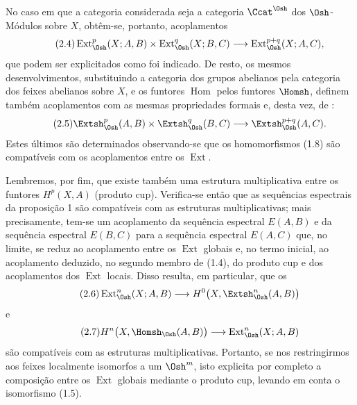 No caso em que a categoria considerada seja a categoria $\Ccat^{\Osh}$ dos
$\Osh$-Módulos sobre $X$, obtêm-se, portanto, acoplamentos
\begin{equation}\tag{2.4}
  \operatorname{Ext}_{\Osh}^{p}(X;A,B)
  \times\operatorname{Ext}_{\Osh}^{q}(X;B,C)
  \longrightarrow\operatorname{Ext}_{\Osh}^{p+q}(X;A,C),
\end{equation}
que podem ser explicitados como foi indicado. De resto, os mesmos
desenvolvimentos, substituindo a categoria dos grupos abelianos pela
categoria dos feixes abelianos sobre $X$, e os funtores $\operatorname{Hom}$
pelos funtores $\Homsh$, definem também acoplamentos com as mesmas
propriedades formais e, desta vez, de :
\begin{equation}\tag{2.5}
  \Extsh_{\Osh}^{p}(A,B)\times\Extsh_{\Osh}^{q}(B,C)
  \longrightarrow\Extsh_{\Osh}^{p+q}(A,C).
\end{equation}
Estes últimos são determinados observando-se que os homomorfismos (1.8) são
compatíveis com os acoplamentos entre os $\operatorname{Ext}$.

Lembremos, por fim, que existe também uma estrutura multiplicativa entre os funtores
$H^{p}(X,A)$ (produto cup). Verifica-se então que as sequências espectrais da
proposição 1 são compatíveis com as estruturas multiplicativas; mais
precisamente, tem-se um acoplamento da sequência espectral $E(A,B)$ e da sequência
espectral $E(B,C)$ para a sequência espectral $E(A,C)$ que, no limite,
se reduz ao acoplamento entre os $\operatorname{Ext}$ globais e, no
termo inicial, ao acoplamento deduzido, no segundo membro de (1.4), do
produto cup e dos acoplamentos dos $\operatorname{Ext}$ locais. Disso resulta,
em particular, que os 
\begin{equation}\tag{2.6}
  \operatorname{Ext}_{\Osh}^{n}(X;A,B)
  \longrightarrow H^{0}\bigl(X,\Extsh_{\Osh}^{n}(A,B)\bigr)
\end{equation}
e
\begin{equation}\tag{2.7}
  H^{n}\bigl(X,\Homsh_{\Osh}(A,B)\bigr)
  \longrightarrow\operatorname{Ext}_{\Osh}^{n}(X;A,B)
\end{equation}
são compatíveis com as estruturas multiplicativas. Portanto, se nos restringirmos aos
feixes localmente isomorfos a um $\Osh^{m}$, isto explicita por completo a
composição entre os $\operatorname{Ext}$ globais mediante o produto cup, levando
em conta o isomorfismo (1.5).


